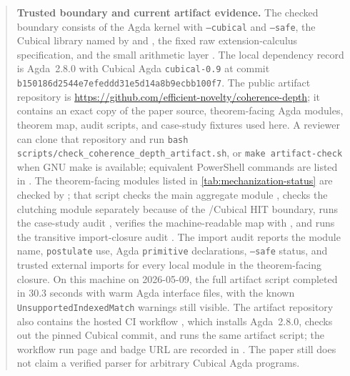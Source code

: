 \documentclass{lmcs}
\begin{document}
\begin{quote}
\small
\textbf{Trusted boundary and current artifact evidence.}
The checked boundary consists of the Agda kernel with \texttt{--cubical} and
\texttt{--safe}, the Cubical library named by
 and ,
the fixed raw extension-calculus specification, and the small arithmetic layer
. The local dependency record is Agda~2.8.0 with
Cubical Agda \texttt{cubical-0.9} at commit
\texttt{b150186d2544e7efeddd31e5d14a8b9ecbb100f7}. The public artifact
repository is
\url{https://github.com/efficient-novelty/coherence-depth}; it contains an exact
copy of the paper source, theorem-facing Agda modules, theorem map, audit
scripts, and case-study fixtures used here. A reviewer can clone that repository
and run \texttt{bash scripts/check\_coherence\_depth\_artifact.sh}, or
\texttt{make artifact-check} when GNU make is available; equivalent PowerShell
commands are listed in . The theorem-facing modules
listed in \autoref{tab:mechanization-status} are checked by
; that script checks the
main aggregate module , checks the clutching
module separately because of the /Cubical HIT boundary,
runs the case-study audit , verifies
the machine-readable map  with
, and runs the transitive import-closure
audit . The import audit reports the
module name, \texttt{postulate} use, Agda \texttt{primitive} declarations,
\texttt{--safe} status, and trusted external imports for every local module in
the theorem-facing closure. On this machine on 2026-05-09, the full artifact
script completed in 30.3 seconds with warm Agda interface files, with the known
\texttt{UnsupportedIndexedMatch} warnings still visible. The artifact
repository also contains the hosted CI workflow
, which installs Agda~2.8.0,
checks out the pinned Cubical commit, and runs the same artifact script; the
workflow run page and badge URL are recorded in . The
paper still does not claim a verified parser for arbitrary Cubical Agda
programs.
\end{quote}
\end{document}
